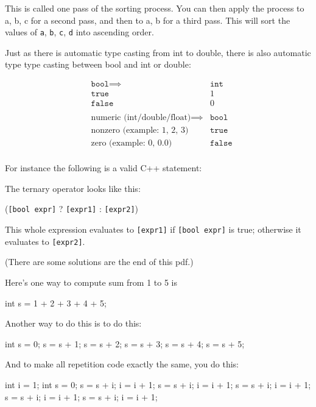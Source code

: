 This is called one pass of the sorting process. You can then apply the
process to a, b, c for a second pass, and then to a, b for a third pass.
This will sort the values of \texttt{a}, \texttt{b}, \texttt{c}, \texttt{d} into
ascending order.

Just as there is automatic type casting from int to double, there is
also automatic type type casting between bool and int or double:

\begin{align*}
&\texttt{bool} \implies &\texttt{int}\\
&\texttt{true} &1\\
&\texttt{false} &0\\\\
&\text{numeric (int/double/float)} \implies &\texttt{bool}\\
&\text{nonzero (example: 1, 2, 3)} &\texttt{true}\\
&\text{zero (example: 0, 0.0)} &\texttt{false}\\
\end{align*}

For instance the following is a valid C++ statement:

The ternary operator looks like this:
\begin{center}
(\texttt{[bool expr]} ? \texttt{[expr1]} : \texttt{[expr2]})
\end{center}
This whole expression evaluates to \texttt{[expr1]} if \texttt{[bool
expr]} is true; otherwise it evaluates to \texttt{[expr2]}.

\newpage{}

(There are some solutions are the end of this pdf.)

Here's one way to compute sum from 1 to 5 is
\begin{console}
int s = 1 + 2 + 3 + 4 + 5; 
\end{console}

Another way to do this is to do this:
\begin{console}
int s = 0;
s = s + 1;
s = s + 2;
s = s + 3;
s = s + 4;
s = s + 5; 
\end{console}

And to make all repetition code exactly the same, you do this:
\begin{console}
int i = 1;
int s = 0;
s = s + i;
i = i + 1;
s = s + i;
i = i + 1;
s = s + i;
i = i + 1;
s = s + i;
i = i + 1;
s = s + i;
i = i + 1; 
\end{console}

